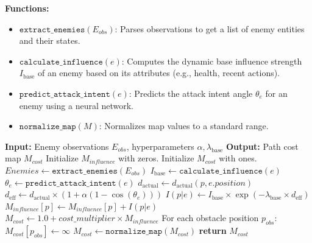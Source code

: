 \textbf{Functions:}
\begin{itemize}
\item $\texttt{extract\_enemies}(E_{obs})$: Parses observations to get a list of enemy entities and their states.
\item $\texttt{calculate\_influence}(e)$: Computes the dynamic base influence strength $I_{\text{base}}$ of an enemy based on its attributes (e.g., health, recent actions).
\item $\texttt{predict\_attack\_intent}(e)$: Predicts the attack intent angle $\theta_e$ for an enemy using a neural network.
\item $\texttt{normalize\_map}(M)$: Normalizes map values to a standard range.
\end{itemize}

\begin{algorithm}[H]
\caption{Interference Prediction and Cost Calculation}
\label{alg:interference-prediction}
\begin{algorithmic}[1]
\STATE \textbf{Input:} Enemy observations $E_{obs}$, hyperparameters $\alpha, \lambda_{\text{base}}$
\STATE \textbf{Output:} Path cost map $M_{cost}$
\STATE {}
\STATE Initialize $M_{influence}$ with zeros.
\STATE Initialize $M_{cost}$ with ones.
\STATE {}
\STATE $Enemies \leftarrow \texttt{extract\_enemies}(E_{obs})$
    \STATE $I_{\text{base}} \leftarrow \texttt{calculate\_influence}(e)$ 
    \STATE $\theta_e \leftarrow \texttt{predict\_attack\_intent}(e)$ 
        \STATE $d_{\text{actual}} \leftarrow d_{\text{actual}}(p, e.position)$
\STATE $d_{\text{eff}} \leftarrow d_{\text{actual}} \times (1 + \alpha(1 - \cos(\theta_e)))$ 
        \STATE $I(p|e) \leftarrow I_{\text{base}} \times \exp(-\lambda_{\text{base}} \times d_{\text{eff}})$
        \STATE $M_{influence}[p] \leftarrow M_{influence}[p] + I(p|e)$
    \ENDFOR
\ENDFOR
\STATE {}
\STATE $M_{cost} \leftarrow 1.0 + cost\_multiplier \times M_{influence}$ 
\STATE For each obstacle position $p_{obs}$: $M_{cost}[p_{obs}] \leftarrow \infty$
\STATE $M_{cost} \leftarrow \texttt{normalize\_map}(M_{cost})$
\STATE \textbf{return} $M_{cost}$
\end{algorithmic}
\end{algorithm}

